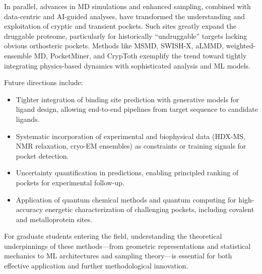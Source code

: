 \documentclass[12pt,a4paper]{article}
\begin{document}
In parallel, advances in MD simulations and enhanced sampling, combined with data-centric and AI-guided analyses, have transformed the understanding and exploitation of cryptic and transient pockets. Such sites greatly expand the druggable proteome, particularly for historically ``undruggable'' targets lacking obvious orthosteric pockets. Methods like MSMD, SWISH-X, aLMMD, weighted-ensemble MD, PocketMiner, and CrypToth exemplify the trend toward tightly integrating physics-based dynamics with sophisticated analysis and ML models.\cite{CH5_Kuzmanic2020,CH5_meller2023predicting,CH5_koseki2025cryptoth,CH5_zhang2026decrypting}

Future directions include:
\begin{itemize}
    \item Tighter integration of binding site prediction with generative models for ligand design, allowing end-to-end pipelines from target sequence to candidate ligands.
    \item Systematic incorporation of experimental and biophysical data (HDX-MS, NMR relaxation, cryo-EM ensembles) as constraints or training signals for pocket detection.
    \item Uncertainty quantification in predictions, enabling principled ranking of pockets for experimental follow-up.
    \item Application of quantum chemical methods and quantum computing for high-accuracy energetic characterization of challenging pockets, including covalent and metalloprotein sites.
\end{itemize}

For graduate students entering the field, understanding the theoretical underpinnings of these methods---from geometric representations and statistical mechanics to ML architectures and sampling theory---is essential for both effective application and further methodological innovation.


\end{document}
